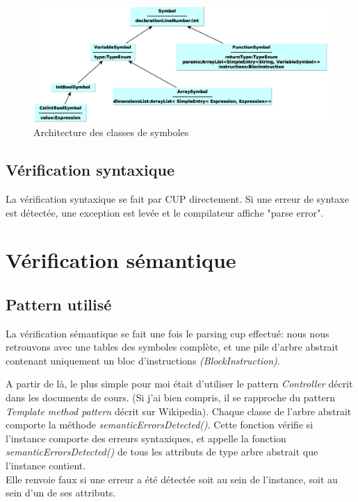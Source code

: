 \documentclass[11pt,a4paper]{article}
\begin{document}
   \begin{figure}[h]
    \includegraphics[width=1\textwidth,center]{../ressources/classesDesSymboles.eps}
        \caption{Architecture des classes de symboles}
   \end{figure}
   
   \subsection{Vérification syntaxique}
   
   \par La vérification syntaxique se fait par CUP directement. Si une erreur de syntaxe est détectée, une exception est levée et le compilateur affiche "parse error".   
   
   
  \section{Vérification sémantique}

  \subsection{Pattern utilisé}
  
  \par La vérification sémantique se fait une fois le parsing cup effectué: nous nous retrouvons avec une tables des symboles complète, et une pile d'arbre abstrait contenant uniquement un bloc d'instructions \textit{(BlockInstruction)}. 
  
  \par A partir de là, le plus simple pour moi était d'utiliser le pattern \textit{Controller} décrit dans les documents de cours. (Si j'ai bien compris, il se rapproche du pattern \textit{Template method pattern} décrit sur Wikipedia). Chaque classe de l'arbre abstrait comporte la méthode \textit{semanticErrorsDetected()}. Cette fonction vérifie si l'instance comporte des erreurs syntaxiques, et appelle la fonction  \textit{semanticErrorsDetected()} de tous les attributs de type arbre abstrait que l'instance contient. \\
  Elle renvoie faux si une erreur a été détectée soit au sein de l'instance, soit au sein d'un de ses attributs. 
\end{document}
